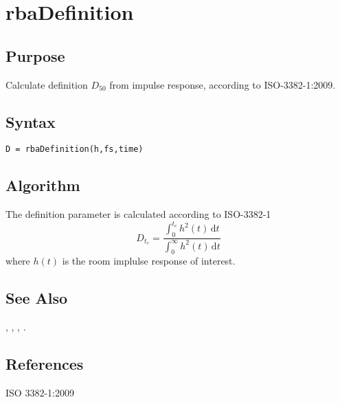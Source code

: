 
\chapter{rbaDefinition} %
\label{cha:rbaDefinition} %

\section{Purpose} %
\label{sec:rbaDefinition_purpose}
Calculate definition $D_50$ from impulse response, according to ISO-3382-1:2009.


\section{Syntax} %
\label{sec:rbaDefinition_syntax}
\texttt{D = rbaDefinition(h,fs,time)}



\section{Algorithm} %
\label{sec:rbaDefinition_algorithm}

The definition parameter is calculated according to ISO-3382-1
\begin{equation}
	D_{t_e} = \frac{\int_{0}^{t_e} h^2(t) \,\mathrm{d} t}{\int_{0}^{\infty} h^2(t) \,\mathrm{d} t}
\end{equation}
where $h(t)$ is the room implulse response of interest.

\section{See Also} %
\label{sec:rbaDefinition_see_also}

\texttt{}, \quad \texttt{}, \quad \texttt{}, \quad \texttt{}.


\section{References} %
\label{sec:rbaDefinition_references}

ISO 3382-1:2009

